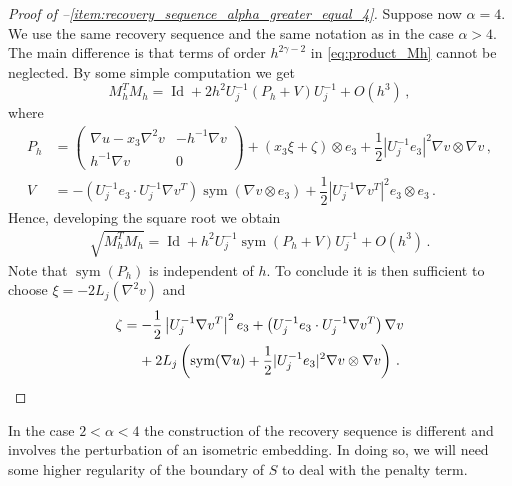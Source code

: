 \documentclass{article}
\theoremstyle{plain}
\theoremstyle{plain}
\theoremstyle{plain}
\theoremstyle{plain}
\theoremstyle{plain}
\theoremstyle{definition}
\theoremstyle{definition}
\DeclareMathOperator{\Id}{Id}
\DeclareMathOperator{\sym}{sym}
\begin{document}
\begin{proof}[Proof of --\ref{item:recovery_sequence_alpha_greater_equal_4}]
    Suppose now $\alpha = 4$. We use the same recovery sequence and the same notation as in the case $\alpha > 4$. The main difference is that terms of order $h^{2\gamma - 2}$ in \eqref{eq:product_Mh} cannot be neglected. By some simple computation we get
    \[
        M_h^TM_h = \Id + 2h^2U_j^{-1}(P_h + V)U_j^{-1} + O(h^3)\,,
    \]
    where
    \begin{align}
    P_h & = \begin{pmatrix}
    \nabla u - x_3 \nabla^2 v & - h^{-1} \nabla v\\
    h^{-1} \nabla v & 0
    \end{pmatrix} + (x_3 \xi + \zeta) \otimes e_3 + \dfrac{1}{2}|U_j^{-1} e_3|^2 \nabla v \otimes \nabla v \,,\\
    V & = - \left(U_j^{-1}e_3 \cdot U_j^{-1} \nabla v^T \right) \sym(\nabla v \otimes e_3) + \dfrac{1}{2}\left| U_j^{-1} \nabla v^T\right|^2 e_3 \otimes e_3 \,.   
    \end{align}
    Hence, developing the square root we obtain
    \begin{align}
    \sqrt{M_h^TM_h} = \Id + h^2U_j^{-1}\sym(P_h+ V)U_j^{-1} + O(h^3) \,.
    \end{align}
    Note that $\sym(P_h)$ is independent of $h$. To conclude it is then sufficient to choose $\xi = -2L_j(\nabla^2 v)$ and 
    \begin{align}
    \zeta & = -\frac{1}{2}\left|U_j^{-1} \nabla v^T\right|^2 e_3 + \left( U_j^{-1}e_3 \cdot  U_j^{-1}\nabla v^T \right) \nabla v\\
    & \hphantom{=} \, \, + 2L_j\left(\sym(\nabla u) + \frac{1}{2}|U_j^{-1}e_3|^2\nabla v \otimes \nabla v\right) \,.   
    \end{align}
\end{proof}

In the case $2 < \alpha < 4$ the construction of the recovery sequence is different and involves the perturbation of an isometric embedding. In doing so, we will need some higher regularity of the boundary of $S$ to deal with the penalty term.
\end{document}
